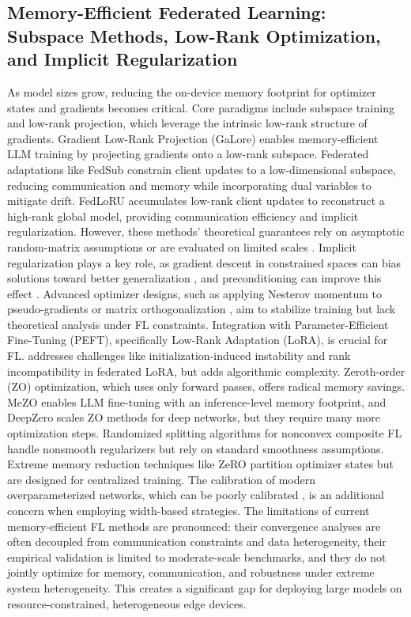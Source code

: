 \documentclass[11pt]{article}
\begin{document}
\subsection{Memory-Efficient Federated Learning: Subspace Methods, Low-Rank Optimization, and Implicit Regularization}
As model sizes grow, reducing the on-device memory footprint for optimizer states and gradients becomes critical. Core paradigms include subspace training and low-rank projection, which leverage the intrinsic low-rank structure of gradients. Gradient Low-Rank Projection (GaLore) \citep{Zhao2024GaLoreML} enables memory-efficient LLM training by projecting gradients onto a low-rank subspace. Federated adaptations like FedSub \citep{zhang2025efficient} constrain client updates to a low-dimensional subspace, reducing communication and memory while incorporating dual variables to mitigate drift. FedLoRU \citep{Park2024CommunicationEfficientFL} accumulates low-rank client updates to reconstruct a high-rank global model, providing communication efficiency and implicit regularization. However, these methods' theoretical guarantees rely on asymptotic random-matrix assumptions \citep{Park2024CommunicationEfficientFL} or are evaluated on limited scales \citep{zhang2025efficient}. Implicit regularization plays a key role, as gradient descent in constrained spaces can bias solutions toward better generalization \citep{Ma2017ImplicitRI, sekhari2021sgd}, and preconditioning can improve this effect \citep{su2024improving}. Advanced optimizer designs, such as applying Nesterov momentum to pseudo-gradients \citep{kallusky2025snoo} or matrix orthogonalization \citep{liu2025fedmuon}, aim to stabilize training but lack theoretical analysis under FL constraints. Integration with Parameter-Efficient Fine-Tuning (PEFT), specifically Low-Rank Adaptation (LoRA), is crucial for FL. \citet{Zhou2025ILoRAFL} addresses challenges like initialization-induced instability and rank incompatibility in federated LoRA, but adds algorithmic complexity. Zeroth-order (ZO) optimization, which uses only forward passes, offers radical memory savings. MeZO \citep{Malladi2023FineTuningLM} enables LLM fine-tuning with an inference-level memory footprint, and DeepZero \citep{chen2023deepzero} scales ZO methods for deep networks, but they require many more optimization steps. Randomized splitting algorithms for nonconvex composite FL \citep{Tran-Dinh2021FedDRR} handle nonsmooth regularizers but rely on standard smoothness assumptions. Extreme memory reduction techniques like ZeRO \citep{Rajbhandari2019ZeROMO} partition optimizer states but are designed for centralized training. The calibration of modern overparameterized networks, which can be poorly calibrated \citep{Guo2017OnCO}, is an additional concern when employing width-based strategies. The limitations of current memory-efficient FL methods are pronounced: their convergence analyses are often decoupled from communication constraints and data heterogeneity, their empirical validation is limited to moderate-scale benchmarks, and they do not jointly optimize for memory, communication, and robustness under extreme system heterogeneity. This creates a significant gap for deploying large models on resource-constrained, heterogeneous edge devices.



\end{document}
